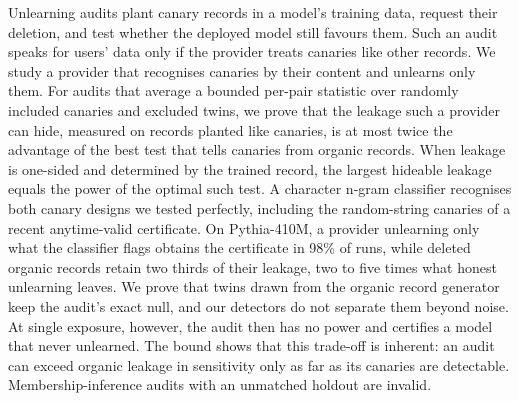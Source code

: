 Unlearning audits plant canary records in a model's training data, request their deletion,
and test whether the deployed model still favours them.
Such an audit speaks for users' data only if the provider treats canaries like other
records. We study a provider that recognises canaries by their content and unlearns only them. For audits that average a bounded
per-pair statistic over randomly included canaries and excluded twins, we prove that the
leakage such a provider can hide, measured on records planted like canaries, is at most twice
the advantage of the best test that tells canaries from organic records. When leakage is
one-sided and determined by the trained record, the largest hideable leakage equals the power
of the optimal such test. A character n-gram classifier recognises both canary designs we
tested perfectly, including the random-string canaries of a recent anytime-valid
certificate. On Pythia-410M, a provider unlearning only what the classifier flags obtains
the certificate in 98\% of runs, while deleted organic records retain
two thirds of their leakage, two to five times what honest unlearning leaves. We prove that twins drawn from the organic record generator
keep the audit's exact null, and our detectors do not separate them beyond noise. At single
exposure, however, the audit then has no power and certifies a model that never unlearned. The bound shows that this trade-off is inherent: an audit can exceed organic leakage in
sensitivity only as far as its canaries are detectable. Membership-inference
audits with an unmatched holdout are invalid.
